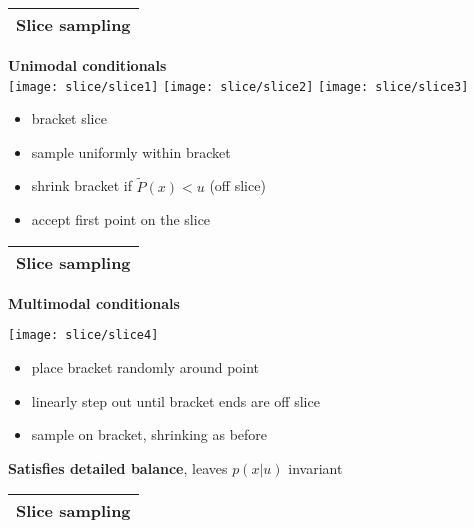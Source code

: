 \documentclass[25pt,landscape]{foils}
\newcommand{\Gray}{\textcolor{mygray}}
\newcommand{\Green}{\textcolor{mypine}}
\newcommand{\myfoilhead}[1]{
\newpage
\vspace*{-1cm}
\Gray{
\begin{tabular*}{\textwidth}{l}
{\bf \Huge #1} \\
\bottomrule
\end{tabular*}}}
\begin{document}
\myfoilhead{Slice sampling}

\vspace*{1.5cm}

\Green{\bf Unimodal conditionals}\\

\texttt{[image: slice/slice1]}\hfill%
\texttt{[image: slice/slice2]}\hfill%
\texttt{[image: slice/slice3]}

\vfill

\begin{itemize}
    \setlength{\itemsep}{5pt}
    \setlength{\parskip}{5pt}
    \setlength{\parsep}{0cm}
    \item bracket slice
    \item sample uniformly within bracket
    \item shrink bracket if $\tilde{P}(x)<u$ (off slice)
    \item accept first point on the slice
\end{itemize}

\vfill

\myfoilhead{Slice sampling}

\vspace*{1.5cm}

\Green{\bf Multimodal conditionals}\\

\centerline{\texttt{[image: slice/slice4]}}

\vfill

\begin{itemize}
    \setlength{\itemsep}{5pt}
    \setlength{\parskip}{5pt}
    \setlength{\parsep}{0cm}
    \item place bracket randomly around point
    \item linearly step out until bracket ends are off slice
    \item sample on bracket, shrinking as before
\end{itemize}

\Green{\bf Satisfies detailed balance}, leaves $p(x|u)$ invariant

\myfoilhead{Slice sampling}

\vfill

\end{document}
